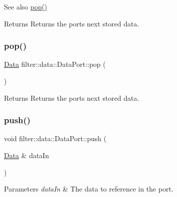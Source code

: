 \begin{DoxySeeAlso}{See also}
\hyperlink{classfilter_1_1data_1_1_data_port_a236dbb70802799eb937cec5020b78bdd}{pop()} 
\end{DoxySeeAlso}
\begin{DoxyReturn}{Returns}
Returns the port\textquotesingle{}s next stored data. 
\end{DoxyReturn}
\mbox{\label{classfilter_1_1data_1_1_data_port_a236dbb70802799eb937cec5020b78bdd}} 
\subsubsection{\texorpdfstring{pop()}{pop()}}
{\footnotesize\ttfamily \hyperlink{classfilter_1_1data_1_1_data}{Data} filter\+::data\+::\+Data\+Port\+::pop (\begin{DoxyParamCaption}{ }\end{DoxyParamCaption})\hspace{0.3cm}{\ttfamily [inline]}}

\begin{DoxyReturn}{Returns}
Returns the port\textquotesingle{}s next stored data. 
\end{DoxyReturn}
\mbox{\label{classfilter_1_1data_1_1_data_port_ac3701e8da30bbc0d5f47a8dffc3dea23}} 
\subsubsection{\texorpdfstring{push()}{push()}}
{\footnotesize\ttfamily void filter\+::data\+::\+Data\+Port\+::push (\begin{DoxyParamCaption}\item[{\hyperlink{classfilter_1_1data_1_1_data}{Data} \&}]{data\+In }\end{DoxyParamCaption})\hspace{0.3cm}{\ttfamily [inline]}}


\begin{DoxyParams}{Parameters}
{\em data\+In} & The data to reference in the port. \\
\hline
\end{DoxyParams}
\mbox{\label{classfilter_1_1data_1_1_data_port_aa1adeffd41c34c3d8780daa2bbf9742f}} 
